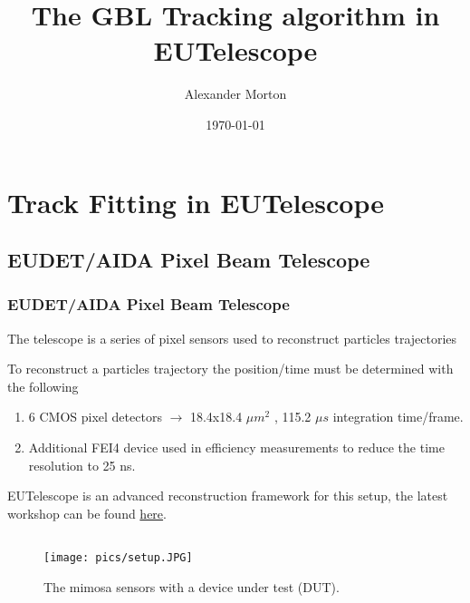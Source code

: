 \documentclass{beamer}
\title[EUTelescope and GBL]{The GBL Tracking algorithm in EUTelescope} %
\author{Alexander Morton} %
\institute[Glasgow] %
{
University of Glasgow \\ %
\medskip
\textit{a.morton.2@research.com} %
}
\date{\today} %
\begin{document}
\begin{frame}
\titlepage %
\end{frame}




\section{Track Fitting in EUTelescope}
\subsection{EUDET/AIDA Pixel Beam Telescope}
\begin{frame}
\frametitle{EUDET/AIDA Pixel Beam Telescope}
\begin{itemize}
\small{
\item The telescope is a series of pixel sensors used to reconstruct particles trajectories
\item To reconstruct a particles trajectory the position/time must be determined with the following 
\begin{enumerate}
\item  6 CMOS pixel detectors $\rightarrow$ 18.4x18.4 $\mu m^{2}$ , 115.2 $\mu s$ integration time/frame.
\item Additional FEI4 device used in efficiency measurements to reduce the time resolution to 25 ns.
\end{enumerate}
\item EUTelescope is an advanced reconstruction framework for this setup, the latest workshop can be found \href{https://indico.desy.de/conferenceDisplay.py?ovw=True&confId=10685}{here}.
}
\end{itemize}
\begin{figure}
  \begin{columns}
        \texttt{[image: pics/setup.JPG]}
        \label{fig:example left}
        \caption{The mimosa sensors with a device under test (DUT).}
      \end{columns}
\end{figure}
\end{frame}
\end{document}
